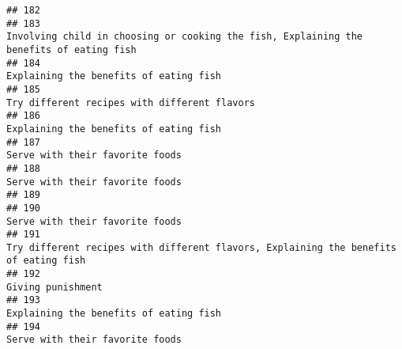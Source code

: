 \documentclass[
]{article}
\begin{document}
\begin{verbatim}
## 182                                                                                                                                                                                                             
## 183                                                                                                                      Involving child in choosing or cooking the fish, Explaining the benefits of eating fish
## 184                                                                                                                                                                       Explaining the benefits of eating fish
## 185                                                                                                                                                                 Try different recipes with different flavors
## 186                                                                                                                                                                       Explaining the benefits of eating fish
## 187                                                                                                                                                                              Serve with their favorite foods
## 188                                                                                                                                                                              Serve with their favorite foods
## 189                                                                                                                                                                                                             
## 190                                                                                                                                                                              Serve with their favorite foods
## 191                                                                                                                         Try different recipes with different flavors, Explaining the benefits of eating fish
## 192                                                                                                                                                                                           Giving punishment 
## 193                                                                                                                                                                       Explaining the benefits of eating fish
## 194                                                                                                                                                                              Serve with their favorite foods

\end{verbatim}
\end{document}
